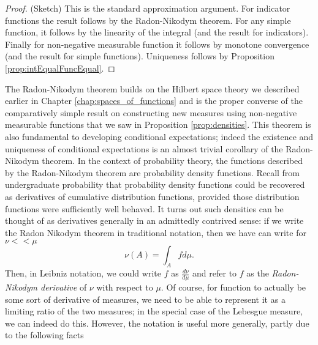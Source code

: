 \begin{proof}
(Sketch) This is the standard approximation argument. For indicator
functions the result follows by the Radon-Nikodym theorem. For any
simple function, it follows by the linearity of the integral (and
the result for indicators). Finally for non-negative measurable function
it follows by monotone convergence (and the result for simple functions).
Uniqueness follows by Proposition \ref{prop:intEqualFuncEqual}.
\end{proof}
The Radon-Nikodym theorem builds on the Hilbert space theory we described
earlier in Chapter \ref{chap:spaces_of_functions} and is the proper
converse of the comparatively simple result on constructing new measures
using non-negative measurable functions that we saw in Proposition
\ref{prop:densities}. This theorem is also fundamental to developing
conditional expectations; indeed the existence and uniqueness of conditional
expectations is an almost trivial corollary of the Radon-Nikodym theorem.
In the context of probability theory, the functions described by the
Radon-Nikodym theorem are probability density functions. Recall from
undergraduate probability that probability density functions could
be recovered as derivatives of cumulative distribution functions,
provided those distribution functions were sufficiently well behaved.
It turns out such densities can be thought of as derivatives generally
in an admittedly contrived sense: if we write the Radon Nikodym theorem
in traditional notation, then we have can write for $\nu<<\mu$
\[
\nu\left(A\right)=\int_{A}fd\mu.
\]
Then, in Leibniz notation, we could write $f$ as $\frac{d\nu}{d\mu}$
and refer to $f$ as the \emph{Radon-Nikodym derivative }of $\nu$
with respect to $\mu$. Of course, for function to actually be some
sort of derivative of measures, we need to be able to represent it
as a limiting ratio of the two measures; in the special case of the
Lebesgue measure, we can indeed do this. However, the notation is
useful more generally, partly due to the following facts
